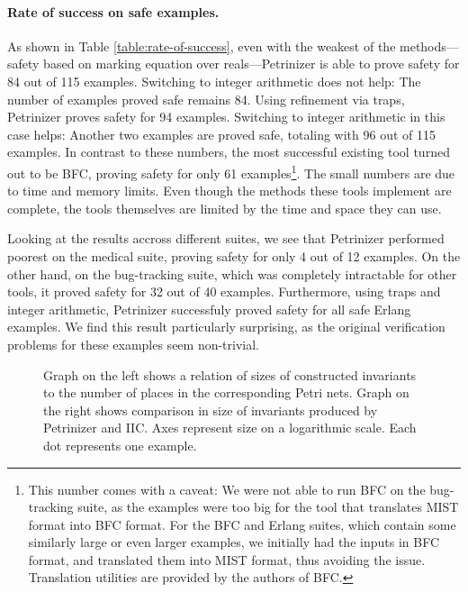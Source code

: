 \paragraph{Rate of success on safe examples.} As shown in Table
\ref{table:rate-of-success}, even with the weakest of the methods---safety based
on marking equation over reals---Petrinizer is able to prove safety for 84 out
of 115 examples. Switching to integer arithmetic does not help: The number of
examples proved safe remains 84. Using refinement via traps, Petrinizer proves
safety for 94 examples. Switching to integer arithmetic in this case helps:
Another two examples are proved safe, totaling with 96 out of 115 examples. In
contrast to these numbers, the most successful existing tool turned out to be BFC, proving safety for
only 61 examples\footnote{This number comes with a caveat: We were not able to
run BFC on the bug-tracking suite, as the examples were too big for the tool that translates
MIST format into BFC format. For the BFC and Erlang suites, which contain
some similarly large or even larger examples, we initially had the inputs in BFC
format, and translated them into MIST format, thus avoiding the issue. Translation
utilities are provided by the authors of BFC.}. The small numbers are due to
time and memory limits. Even though the methods these tools implement
are complete, the tools themselves are limited by the time and space they can
use.

Looking at the results accross different suites, we see that Petrinizer
performed poorest on the medical suite, proving safety for only 4 out of 12
examples. On the other hand, on the bug-tracking suite, which was completely
intractable for other tools, it proved safety for 32 out of 40 examples.
Furthermore, using traps and integer arithmetic, Petrinizer successfuly proved
safety for all safe Erlang examples. We find this result particularly
surprising, as the original verification problems for these examples seem non-trivial.

\begin{figure}[t]
  \centering
  
  \caption{Graph on the left shows a relation of sizes of constructed
  invariants to the number of places in the corresponding Petri nets. Graph
  on the right shows comparison in size of invariants produced by Petrinizer and
  IIC. Axes represent size on a logarithmic scale. Each dot represents one example.}
  \label{fig:invariant-size}
\end{figure}

